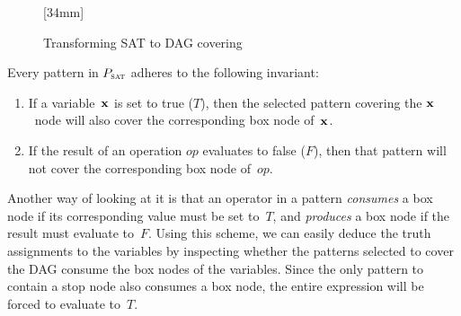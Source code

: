 \begin{figure}
{\begin{minipage}{87mm}
                    \hfill%
                    \hfill%
                    \hfill%
                  \end{minipage}%
                }%
  \hfill%
                [34mm]%
                {%
                }

  \caption[Transforming SAT into DAG covering]
          {Transforming SAT to DAG covering~\cite{KoesGoldstein:2008}}
\end{figure}
%
Every \gls{pattern} in $P_{\textrm{\textsc{sat}}}$ adheres to the following invariant:
%
\begin{enumerate}
  \item If a \gls{variable}~$\mVar{x}$ is set to true ($T$), then the selected
    \gls{pattern} covering the $\mVar{x}$~\gls{node} will also cover the
    corresponding \gls{box node} of~$\mVar{x}$.
  \item If the result of an operation $\mathit{op}$ evaluates to false ($F$),
    then that \gls{pattern} will not cover the corresponding \gls{box node}
    of~$\mathit{op}$.
\end{enumerate}
%
Another way of looking at it is that an operator in a \gls{pattern}
\emph{consumes} a \gls{box node} if its corresponding value must be set to~$T$,
and \emph{produces} a \gls{box node} if the result must evaluate to~$F$.
%
Using this scheme, we can easily deduce the truth assignments to the
\glspl{variable} by inspecting whether the \glspl{pattern} selected to cover the
\gls{DAG} consume the \glspl{box node} of the \glspl{variable}.
%
Since the only \gls{pattern} to contain a \gls{stop node} also consumes a
\gls{box node}, the entire expression will be forced to evaluate to~$T$.

